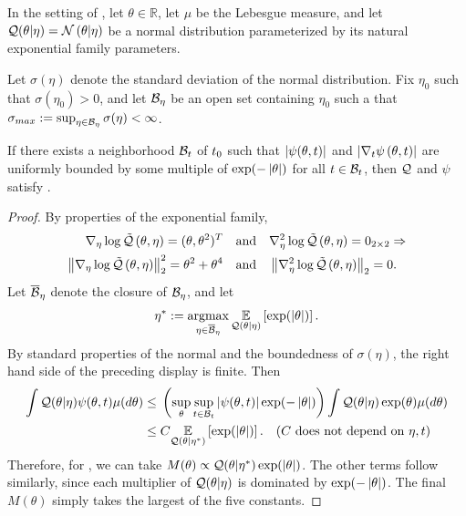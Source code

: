 \begin{lem}
%
In the setting of , let $\theta \in \mathbb{R}$, let
$\mu$ be the Lebesgue measure, and let $\mathcal{Q}(\theta \vert \eta) = \mathcal{N}\left(\theta
\vert \eta\right)$ be a normal distribution parameterized by its natural exponential
family parameters.

Let $\sigma(\eta)$ denote the standard deviation of the normal distribution.
Fix $\eta_0$ such that $\sigma(\eta_0) > 0$, and let $\mathcal{B}_\eta$ be an open set
containing $\eta_0$ such a that $\sigma_{max} := \sup_{\eta \in \mathcal{B}_\eta}
\sigma(\eta) < \infty$.

If there exists a neighborhood $\mathcal{B}_t$ of $t_0$ such that $\left|\psi(\theta,
t)\right|$ and $\left|{\nabla_t \psi}\left(\theta, t\right)\right|$ are uniformly bounded by some multiple of
$\exp(-\left|\theta\right|)$ for all $t \in \mathcal{B}_t$, then $\mathcal{Q}$ and $\psi$ satisfy
.

\begin{proof}
%
By properties of the exponential family,
%
\begin{align*}
%
\lqgrad{\theta, \eta} ={} (\theta, \theta^2)^T \mathand&
\lqhess{\theta, \eta} ={} 0_{2\times2} \Rightarrow\\
%
\norm{\lqgrad{\theta, \eta}}_2^2 ={} \theta^2 + \theta^4 \mathand&
\norm{\lqhess{\theta, \eta}}_2 ={} 0.
%
\end{align*}
%
Let $\overline{\mathcal{B}}_\eta$ denote the closure of $\mathcal{B}_\eta$, and let
%
\begin{align*}
%
\eta^* := \argmax_{\eta \in \ballclosed_\eta}
    \expect{\q(\theta \vert \eta)}{\exp(\abs{\theta})}.
%
\end{align*}
%
By standard properties of the normal and the boundedness of $\sigma(\eta)$, the
right hand side of the preceding display is finite.
%
Then
%
\begin{align*}
\int \q(\theta \vert \eta) \psi(\theta, \t) \mu(d \theta) \le{}&
    \left( \sup_{\theta} \sup_{\t \in \ball_\t}
        \abs{\psi(\theta, \t)} \exp(-\abs{\theta}) \right)
    \int \q(\theta \vert \eta) \exp(\theta) \mu(d \theta)
%
\\\le{}&
    \const
    \expect{\q(\theta \vert \eta^*)}{\exp(\abs{\theta})}.
    \quad\constdesc{\eta, \t}
%
\end{align*}
%
Therefore, for , we can take $M(\theta)
\propto \mathcal{Q}(\theta \vert \eta^*) \exp(\left|\theta\right|)$. The other terms follow
similarly, since each multiplier of $\mathcal{Q}(\theta \vert \eta)$ is dominated by
$\exp(-\left|\theta\right|)$.  The final $M(\theta)$ simply takes the largest
of the five constants.
%
\end{proof}
%
\end{lem}


